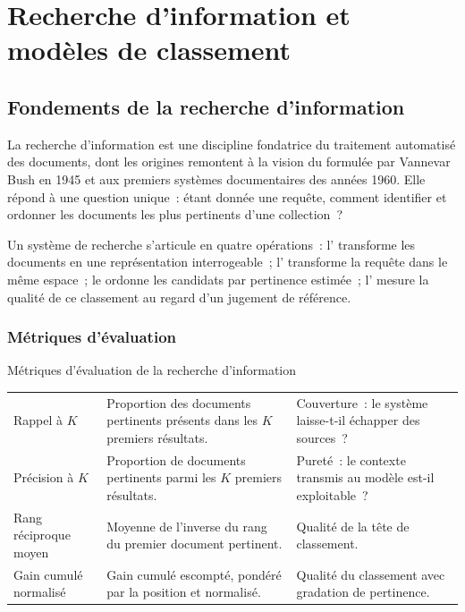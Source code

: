 \section{Recherche d'information et modèles de classement}
\label{sec:ch1-recherche}

\subsection{Fondements de la recherche d'information}

La recherche d'information est une discipline fondatrice du traitement
automatisé des documents, dont les origines remontent à la vision du
 formulée par Vannevar Bush en 1945 et aux premiers systèmes
documentaires des années 1960. Elle répond à une question unique~: étant donnée
une requête, comment identifier et ordonner les documents les plus pertinents
d'une collection~?

Un système de recherche s'articule en quatre opérations~: l'
transforme les documents en une représentation interrogeable~;
l' transforme la requête dans le même espace~; le
 ordonne les candidats par pertinence estimée~;
l' mesure la qualité de ce classement au regard d'un
jugement de référence.

\subsubsection{Métriques d'évaluation}

\begin{btptable}{Métriques d'évaluation de la recherche d'information}
\label{tab:metriques-ri}
\begin{tabularx}{\linewidth}{@{}L{2.8cm} Y L{3.1cm}@{}}
\toprule
{}
 &  &  \\
\midrule
Rappel à $K$ & Proportion des documents pertinents présents dans les $K$ premiers résultats. & Couverture~: le système laisse-t-il échapper des sources~? \\
Précision à $K$ & Proportion de documents pertinents parmi les $K$ premiers résultats. & Pureté~: le contexte transmis au modèle est-il exploitable~? \\
Rang réciproque moyen & Moyenne de l'inverse du rang du premier document pertinent. & Qualité de la tête de classement. \\
Gain cumulé normalisé & Gain cumulé escompté, pondéré par la position et normalisé. & Qualité du classement avec gradation de pertinence. \\
\bottomrule
\end{tabularx}
\end{btptable}

